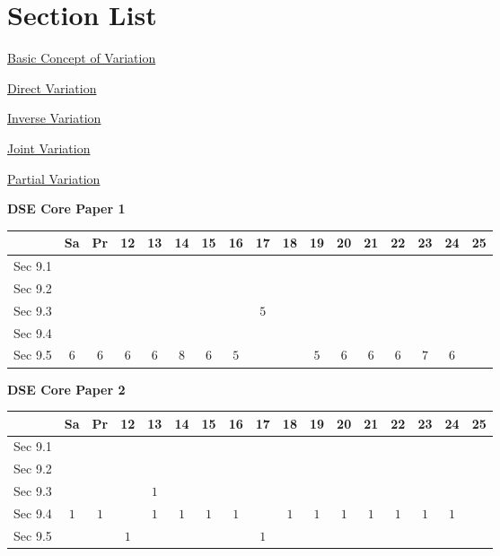 \documentclass[12pt, a4paper]{article}
\begin{document}
\section*{Section List}
\begin{enumx}[label=Sec 9.\arabic*\ ]
\item \hyperref[section:4-9-1]{Basic Concept of Variation}
\item \hyperref[section:4-9-2]{Direct Variation}
\item \hyperref[section:4-9-3]{Inverse Variation}
\item \hyperref[section:4-9-4]{Joint Variation}
\item \hyperref[section:4-9-5]{Partial Variation}
\end{enumx}
\begin{absolutelynopagebreak}
\begin{center}
\textbf{DSE Core Paper 1}
\end{center}
\begin{center}
\begin{tabular}{|l|c|c|c|c|c|c|c|c|c|c|c|c|c|c|c|c|}
\hline
        & Sa & Pr & 12 & 13 & 14 & 15 & 16 & 17 & 18 & 19 & 20 & 21 & 22 & 23 & 24 & 25 \\\hline\hline
Sec 9.1 &  &  &  &  &  &  &  &  &  &  &  &  &  &  &  &  \\\hline
Sec 9.2 &  &  &  &  &  &  &  &  &  &  &  &  &  &  &  &  \\\hline
Sec 9.3 &  &  &  &  &  &  &  &  $5$ &  &  &  &  &  &  &  &  \\\hline
Sec 9.4 &  &  &  &  &  &  &  &  &  &  &  &  &  &  &  &  \\\hline
Sec 9.5 &  $6$ &  $6$ &  $6$ &  $6$ &  $8$ &  $6$ &  $5$ &  &  &  $5$ &  $6$ &  $6$ &  $6$ &  $7$ &  $6$ &  \\\hline
\end{tabular}
\end{center}
\end{absolutelynopagebreak}
\begin{absolutelynopagebreak}
\begin{center}
\textbf{DSE Core Paper 2}
\end{center}
\begin{center}
\begin{tabular}{|l|c|c|c|c|c|c|c|c|c|c|c|c|c|c|c|c|}
\hline
        & Sa & Pr & 12 & 13 & 14 & 15 & 16 & 17 & 18 & 19 & 20 & 21 & 22 & 23 & 24 & 25 \\\hline\hline
Sec 9.1 &  &  &  &  &  &  &  &  &  &  &  &  &  &  &  &  \\\hline
Sec 9.2 &  &  &  &  &  &  &  &  &  &  &  &  &  &  &  &  \\\hline
Sec 9.3 &  &  &  &  $1$ &  &  &  &  &  &  &  &  &  &  &  &  \\\hline
Sec 9.4 &  $1$ &  $1$ &  &  $1$ &  $1$ &  $1$ &  $1$ &  &  $1$ &  $1$ &  $1$ &  $1$ &  $1$ &  $1$ &  $1$ &  \\\hline
Sec 9.5 &  &  &  $1$ &  &  &  &  &  $1$ &  &  &  &  &  &  &  &  \\\hline
\end{tabular}
\end{center}
\end{absolutelynopagebreak}
\end{document}

